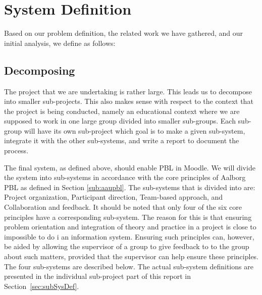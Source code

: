 \section{System Definition}
\label{sec:systemDef}
Based on our problem definition, the related work we have gathered, and our initial analysis, we define \system as follows:












\subsection{Decomposing \system}
\label{sub:decomposingSys}
The project that we are undertaking is rather large.
This leads us to decompose into smaller sub-projects.
This also makes sense with respect to the context that the project is being conducted, namely an educational context where we are supposed to work in one large group divided into smaller sub-groups.
Each sub-group will have its own sub-project which goal is to make a given sub-system, integrate it with the other sub-systems, and write a report to document the process.

The final system, as defined above, should enable PBL in Moodle.
We will divide the system into sub-systems in accordance with the core principles of Aalborg PBL as defined in Section \ref{sub:aaupbl}.
The sub-systems that \system is divided into are:
Project organization,
Participant direction,
Team-based approach, and
Collaboration and feedback.
It should be noted that only four of the six core principles have a corresponding sub-system.
The reason for this is that ensuring problem orientation and integration of theory and practice in a project is close to impossible to do i an information system.
Ensuring such principles can, however, be aided by allowing the supervisor of a group to give feedback to to the group about such matters, provided that the supervisor can help ensure these principles.
The four sub-systems are described below.
The actual sub-system definitions are presented in the individual sub-project part of this report in Section~\ref{sec:subSysDef}. 

